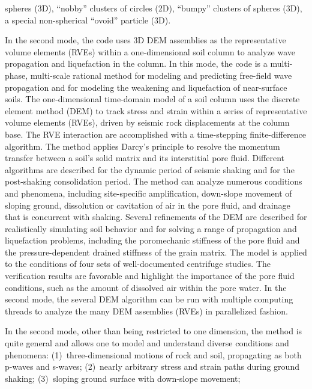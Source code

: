 \documentclass[letterpaper,11pt]{article}
\begin{document}
spheres (3D), 
``nobby'' clusters of circles (2D),
``bumpy'' clusters of spheres (3D),
a special non-spherical ``ovoid'' particle (3D).
%
\par
In the second mode,
the code uses 3D DEM assemblies as the representative
volume elements (RVEs) within a one-dimensional soil column
to analyze wave propagation
and liquefaction in the column.
In this mode, the code is
a multi-phase, multi-scale rational
method for modeling and predicting free-field wave propagation
and for modeling
the weakening and liquefaction of near-surface soils.
The one-dimensional time-domain
model of a soil column uses the discrete element method (DEM) to track
stress and strain within
a series of representative volume elements (RVEs),
driven by seismic rock displacements at
the column base.
The RVE interaction are accomplished with a
time-stepping finite-difference algorithm.
The method applies Darcy's principle to resolve the
momentum transfer between a soil's solid matrix and its
interstitial pore fluid.
Different algorithms are described for the dynamic period of seismic
shaking and for the post-shaking consolidation period.
The method can analyze numerous conditions and phenomena,
including site-specific amplification,
down-slope movement of sloping ground,
dissolution or cavitation of air in the pore fluid,
and drainage that is concurrent with shaking.
Several refinements of the DEM are described for
realistically
simulating soil behavior and for solving a range
of propagation and liquefaction problems,
including the poromechanic stiffness of the pore fluid
and the pressure-dependent drained stiffness of the grain matrix.
The model is applied to the conditions of four sets of
well-documented centrifuge studies.
The verification results are favorable
and highlight the importance of the pore fluid conditions, such as
the amount of dissolved air within the pore water.
In the second mode, the several DEM algorithm can be
run with multiple computing threads to analyze the many
DEM assemblies (RVEs) in parallelized fashion.
%
\par
In the second mode,
other than being restricted to one dimension,
the method is quite general and allows one to model and understand
diverse conditions and phenomena:
(1)~three-dimensional motions of rock and soil,
propagating as both p-waves and s-waves;
(2)~nearly arbitrary stress and strain paths during
ground shaking;
(3)~sloping ground surface with down-slope movement;
\end{document}
